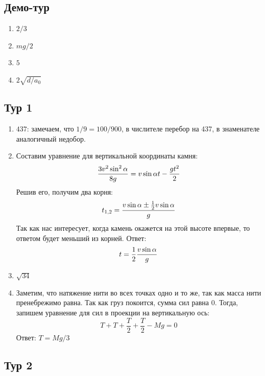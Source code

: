 \documentclass[12pt]{article} %
\begin{document}
\subsection*{Демо-тур}

\begin{enumerate}
\item $2/3$
\item $mg/2$
\item $5$
\item $2\sqrt{d/a_0}$
\end{enumerate}

\subsection*{Тур 1}

\begin{enumerate}
\item $437$: замечаем, что $1/9=100/900$, в числителе перебор на 437, в знаменателе аналогичный недобор.
\item Составим уравнение для вертикальной координаты камня: 
\[ 
{{3v^2\sin^2\alpha}\over{8g}} = v\sin\alpha t - {{gt^2}\over{2}} 
\] 
Решив его, получим два корня: 
\[ t_{1,2} = {{v\sin\alpha \pm \frac{1}{2}v\sin\alpha}\over{g}} \] 
Так как нас интересует, когда камень окажется на этой высоте впервые, то ответом будет меньший из корней. Ответ: \[t=\frac{1}{2} {{v\sin\alpha}\over{g}}\]
\item $\sqrt{34}$
\item Заметим, что натяжение нити во всех точках одно и то же, так как масса нити пренебрежимо равна. Так как груз покоится, сумма сил равна 0. Тогда, запишем уравнение для сил в проекции на вертикальную ось: 
\[ T + T + \frac{T}{2} + \frac{T}{2} - Mg = 0 \] Ответ: $T=Mg/3$\end{enumerate}

\subsection*{Тур 2}
\end{document}
